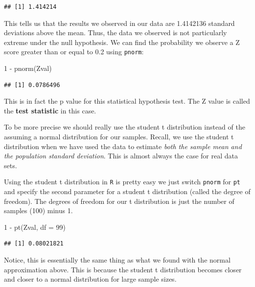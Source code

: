 \documentclass[
]{book}
\newenvironment{Shaded}{\begin{snugshade}}{\end{snugshade}}
\newcommand{\AttributeTok}[1]{\textcolor[rgb]{0.77,0.63,0.00}{#1}}
\newcommand{\DecValTok}[1]{\textcolor[rgb]{0.00,0.00,0.81}{#1}}
\newcommand{\FunctionTok}[1]{\textcolor[rgb]{0.00,0.00,0.00}{#1}}
\newcommand{\NormalTok}[1]{#1}
\newcommand{\SpecialCharTok}[1]{\textcolor[rgb]{0.00,0.00,0.00}{#1}}
\theoremstyle{definition}
\theoremstyle{definition}
\theoremstyle{definition}
\theoremstyle{definition}
\theoremstyle{remark}
\begin{document}
\begin{verbatim}
## [1] 1.414214
\end{verbatim}

This tells us that the results we observed in our data are 1.4142136 standard deviations above the mean. Thus, the data we observed is not particularly extreme under the null hypothesis. We can find the probability we observe a Z score greater than or equal to 0.2 using \texttt{pnorm}:

\begin{Shaded}
\begin{Highlighting}[]
\DecValTok{1} \SpecialCharTok{{-}} \FunctionTok{pnorm}\NormalTok{(Zval)}
\end{Highlighting}
\end{Shaded}

\begin{verbatim}
## [1] 0.0786496
\end{verbatim}

This is in fact the p value for this statistical hypothesis test. The Z value is called the \textbf{test statistic} in this case.

To be more precise we should really use the student t distribution instead of the assuming a normal distribution for our samples. Recall, we use the student t distribution when we have used the data to estimate \emph{both the sample mean and the population standard deviation}. This is almost always the case for real data sets.

Using the student t distribution in \texttt{R} is pretty easy we just switch \texttt{pnorm} for \texttt{pt} and specify the second parameter for a student t distribution (called the degree of freedom). The degrees of freedom for our t distribution is just the number of samples (100) minus 1.

\begin{Shaded}
\begin{Highlighting}[]
\DecValTok{1} \SpecialCharTok{{-}} \FunctionTok{pt}\NormalTok{(Zval, }\AttributeTok{df =} \DecValTok{99}\NormalTok{)}
\end{Highlighting}
\end{Shaded}

\begin{verbatim}
## [1] 0.08021821
\end{verbatim}

Notice, this is essentially the same thing as what we found with the normal approximation above. This is because the student t distribution becomes closer and closer to a normal distribution for large sample sizes.
\end{document}
